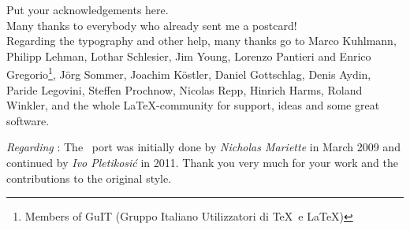 \noindent Put your acknowledgements here.\\

\noindent Many thanks to everybody who already sent me a postcard!\\

\noindent Regarding the typography and other help, many thanks go to Marco Kuhlmann, Philipp Lehman, Lothar Schlesier, Jim Young, Lorenzo Pantieri and Enrico Gregorio\footnote{Members of GuIT (Gruppo Italiano Utilizzatori di \TeX\ e \LaTeX )}, J\"org Sommer, Joachim K\"ostler, Daniel Gottschlag, Denis Aydin, Paride Legovini, Steffen Prochnow, Nicolas Repp, Hinrich Harms, Roland Winkler, and the whole \LaTeX-community for support, ideas and some great software.

\bigskip

\noindent\emph{Regarding \mLyX}: The \mLyX\ port was initially done by
\emph{Nicholas Mariette} in March 2009 and continued by
\emph{Ivo Pletikosi\'c} in 2011. Thank you very much for your work and the contributions to the original style.

\endgroup